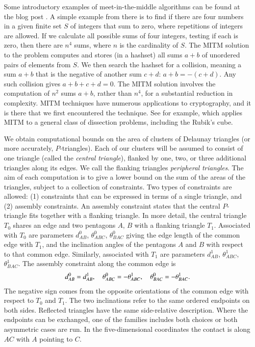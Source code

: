 Some introductory examples of meet-in-the-middle
algorithms can be found at the blog post \cite{mitm}.
A simple example from there is to find if there are four numbers in a
given finite set $S$ of integers that sum to zero, where repetitions
of integers are allowed.  If we calculate all possible sums of four
integers, testing if each is zero, then there are $n^4$ sums, where
$n$ is the cardinality of $S$.  The MITM solution to the problem
computes and stores (in a hashset) all sums $a+b$ of unordered pairs
of elements from $S$.  We then search the hashset for a collision,
meaning a sum $a+b$ that is the negative of another sum $c+d$: $a+b =
-(c+d)$.  Any such collision gives $a+b+c+d=0$.  The MITM solution
involves the computation of $n^2$ sums $a+b$, rather than $n^4$, for a
substantial reduction in complexity.  MITM techniques have numerous
applications to cryptography, and it is there that we first
encountered the technique.  See for example,
\cite{dinur2014dissection}
which applies MITM to a general class of dissection problems,
including the Rubik's cube.

We obtain computational bounds on the area of clusters of Delaunay
triangles (or more accurately, $P$-triangles).  Each of our clusters
will be assumed to consist of one triangle (called the {\it central
triangle}), flanked by one, two, or three additional triangles along
its edges.  We call the flanking triangles {\it peripheral triangles}.
The aim of each computation is to give a lower bound on the sum of the
areas of the triangles, subject to a collection of constraints.  Two
types of constraints are allowed: (1) constraints that can be
expressed in terms of a single triangle, and (2) assembly constraints.
An assembly constraint states that the central $P$-triangle fits
together with a flanking triangle.  In more detail, the central
triangle $T_0$ shares an edge and two pentagons $A$, $B$ with a
flanking triangle $T_1$.  Associated with $T_0$ are parameters
$d^0_{AB}$, $\theta^0_{ABC}$, $\theta^0_{BAC}$ giving the edge length
of the common edge with $T_1$, and the inclination angles of the
pentagons $A$ and $B$ with respect to that common edge.  Similarly,
associated with $T_1$ are parameters $d^1_{AB}$, $\theta^1_{ABC}$,
$\theta^1_{BAC}$.  The assembly constraint along the common edge is
\begin{equation}\libel{eqn:assembly}
d^0_{AB} = d^1_{AB},\quad 
\theta^0_{ABC} = -\theta^1_{ABC},\quad \theta^0_{BAC} = -\theta^1_{BAC}.
\end{equation}
The negative sign comes from the opposite orientations of the common
edge with respect to $T_0$ and $T_1$. The two inclinations refer
to the same ordered endpoints on both sides. Reflected triangles
have the same side-relative description. Where the endpoints can be
exchanged, one of the families includes both choices or both
asymmetric cases are run. In the five-dimensional coordinates the
contact is along $AC$ with $A$ pointing to $C$.

